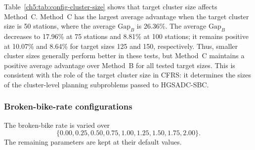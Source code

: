 Table~\ref{ch5:tab:config-cluster-size} shows that target cluster size affects
Method~C. Method~C has the largest average
advantage when the target cluster size is 50 stations, where the average
\(\text{Gap}_B\) is 26.36\%. The average \(\text{Gap}_B\) decreases to 17.96\%
at 75 stations and 8.81\% at 100 stations; it remains positive at 10.07\% and
8.64\% for target sizes 125 and 150, respectively. Thus, smaller cluster sizes
generally perform better in these tests, but Method~C maintains a positive
average advantage over Method~B for all tested target sizes. This is consistent
with the role of the target cluster size in CFRS: it determines the sizes of the
cluster-level planning subproblems passed to HGSADC-SBC.

\subsubsection{Broken-bike-rate configurations}\label{ch5:sec:exp-config-broken-rate}\label{ch5:sec:exp-sens-broken}

The broken-bike rate is varied over
\begin{equation}
\{0.00,0.25,0.50,0.75,1.00,1.25,1.50,1.75,2.00\}.
\end{equation}
The remaining parameters are kept at
their default values.

